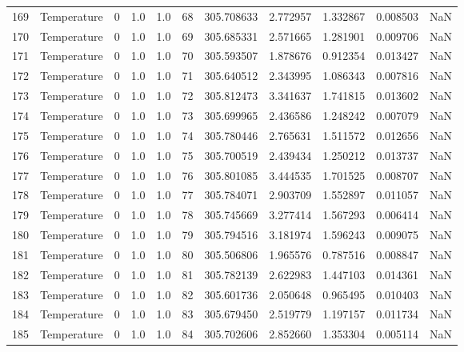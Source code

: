 \begin{tabular}{llrrrrrrrrr}
169 &  Temperature &       0 &  1.0 &  1.0 &   68 &  305.708633 &  2.772957 &  1.332867 &   0.008503 &      NaN \\
170 &  Temperature &       0 &  1.0 &  1.0 &   69 &  305.685331 &  2.571665 &  1.281901 &   0.009706 &      NaN \\
171 &  Temperature &       0 &  1.0 &  1.0 &   70 &  305.593507 &  1.878676 &  0.912354 &   0.013427 &      NaN \\
172 &  Temperature &       0 &  1.0 &  1.0 &   71 &  305.640512 &  2.343995 &  1.086343 &   0.007816 &      NaN \\
173 &  Temperature &       0 &  1.0 &  1.0 &   72 &  305.812473 &  3.341637 &  1.741815 &   0.013602 &      NaN \\
174 &  Temperature &       0 &  1.0 &  1.0 &   73 &  305.699965 &  2.436586 &  1.248242 &   0.007079 &      NaN \\
175 &  Temperature &       0 &  1.0 &  1.0 &   74 &  305.780446 &  2.765631 &  1.511572 &   0.012656 &      NaN \\
176 &  Temperature &       0 &  1.0 &  1.0 &   75 &  305.700519 &  2.439434 &  1.250212 &   0.013737 &      NaN \\
177 &  Temperature &       0 &  1.0 &  1.0 &   76 &  305.801085 &  3.444535 &  1.701525 &   0.008707 &      NaN \\
178 &  Temperature &       0 &  1.0 &  1.0 &   77 &  305.784071 &  2.903709 &  1.552897 &   0.011057 &      NaN \\
179 &  Temperature &       0 &  1.0 &  1.0 &   78 &  305.745669 &  3.277414 &  1.567293 &   0.006414 &      NaN \\
180 &  Temperature &       0 &  1.0 &  1.0 &   79 &  305.794516 &  3.181974 &  1.596243 &   0.009075 &      NaN \\
181 &  Temperature &       0 &  1.0 &  1.0 &   80 &  305.506806 &  1.965576 &  0.787516 &   0.008847 &      NaN \\
182 &  Temperature &       0 &  1.0 &  1.0 &   81 &  305.782139 &  2.622983 &  1.447103 &   0.014361 &      NaN \\
183 &  Temperature &       0 &  1.0 &  1.0 &   82 &  305.601736 &  2.050648 &  0.965495 &   0.010403 &      NaN \\
184 &  Temperature &       0 &  1.0 &  1.0 &   83 &  305.679450 &  2.519779 &  1.197157 &   0.011734 &      NaN \\
185 &  Temperature &       0 &  1.0 &  1.0 &   84 &  305.702606 &  2.852660 &  1.353304 &   0.005114 &      NaN \\

\end{tabular}
